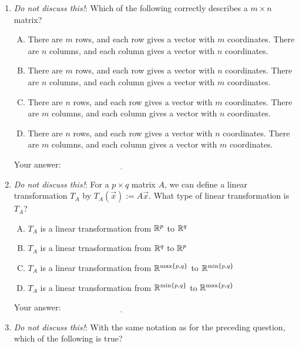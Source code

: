 \documentclass[10pt]{amsart}
\begin{document}
\begin{enumerate}
\item {\em Do not discuss this!}: Which of the following correctly
  describes a $m \times n$ matrix?

  \begin{enumerate}[(A)]
  \item There are $m$ rows, and each row gives a vector with $m$
    coordinates. There are $n$ columns, and each column gives a vector
    with $n$ coordinates.
  \item There are $m$ rows, and each row gives a vector with $n$
    coordinates. There are $n$ columns, and each column gives a vector
    with $m$ coordinates.
  \item There are $n$ rows, and each row gives a vector with $m$
    coordinates. There are $m$ columns, and each column gives a vector
    with $n$ coordinates.
  \item There are $n$ rows, and each row gives a vector with $n$
    coordinates. There are $m$ columns, and each column gives a vector
    with $m$ coordinates.
  \end{enumerate}

  \vspace{0.1in}
  Your answer: $\underline{\qquad\qquad\qquad\qquad\qquad\qquad\qquad}$
  \vspace{0.1in}

\item {\em Do not discuss this!}: For a $p \times q$ matrix $A$, we can
  define a linear transformation $T_A$ by $T_A(\vec{x}) :=
  A\vec{x}$. What type of linear transformation is $T_A$?

  \begin{enumerate}[(A)]
  \item $T_A$ is a linear transformation from $\mathbb{R}^p$ to $\mathbb{R}^q$
  \item $T_A$ is a linear trnasformation from $\mathbb{R}^q$ to $\mathbb{R}^p$
  \item $T_A$ is a linear transformation from $\mathbb{R}^{\max\{p,q \}}$ to $\mathbb{R}^{\min\{p,q\}}$
  \item $T_A$ is a linear transformation from $\mathbb{R}^{\min\{p,q\}}$ to $\mathbb{R}^{\max\{p,q\}}$
  \end{enumerate}

  \vspace{0.1in}
  Your answer: $\underline{\qquad\qquad\qquad\qquad\qquad\qquad\qquad}$
  \vspace{0.1in}

\item {\em Do not discuss this!}: With the same notation as for the
  preceding question, which of the following is true?


\end{enumerate}
\end{document}
